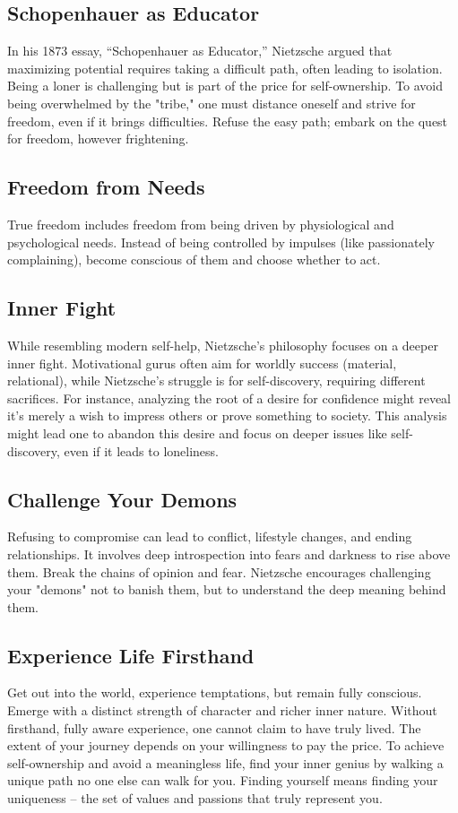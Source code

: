 \subsection*{Schopenhauer as Educator}
In his 1873 essay, “Schopenhauer as Educator,” Nietzsche argued that maximizing potential requires taking a difficult path, often leading to isolation. Being a loner is challenging but is part of the price for self-ownership. To avoid being overwhelmed by the "tribe," one must distance oneself and strive for freedom, even if it brings difficulties. Refuse the easy path; embark on the quest for freedom, however frightening.

\subsection*{Freedom from Needs}
True freedom includes freedom from being driven by physiological and psychological needs. Instead of being controlled by impulses (like passionately complaining), become conscious of them and choose whether to act.

\subsection*{Inner Fight}
While resembling modern self-help, Nietzsche's philosophy focuses on a deeper inner fight. Motivational gurus often aim for worldly success (material, relational), while Nietzsche's struggle is for self-discovery, requiring different sacrifices. For instance, analyzing the root of a desire for confidence might reveal it's merely a wish to impress others or prove something to society. This analysis might lead one to abandon this desire and focus on deeper issues like self-discovery, even if it leads to loneliness.

\subsection*{Challenge Your Demons}
Refusing to compromise can lead to conflict, lifestyle changes, and ending relationships. It involves deep introspection into fears and darkness to rise above them. Break the chains of opinion and fear. Nietzsche encourages challenging your "demons" not to banish them, but to understand the deep meaning behind them.

\subsection*{Experience Life Firsthand}
Get out into the world, experience temptations, but remain fully conscious. Emerge with a distinct strength of character and richer inner nature. Without firsthand, fully aware experience, one cannot claim to have truly lived. The extent of your journey depends on your willingness to pay the price. To achieve self-ownership and avoid a meaningless life, find your inner genius by walking a unique path no one else can walk for you. Finding yourself means finding your uniqueness – the set of values and passions that truly represent you.

